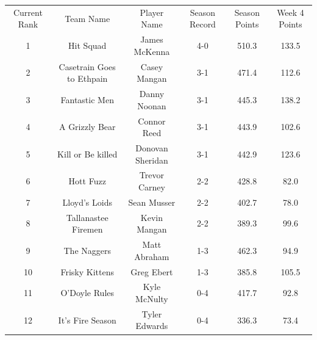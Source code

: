 \documentclass[11pt,letterpaper]{article}
\begin{document}
\newpage
{}
\vspace{-25pt}
\begin{table} [h]
\footnotesize
\begin{center}
\begin{tabular} { c c c c c c }
\\[3mm] Current Rank & Team Name & Player Name & Season Record &  Season Points & Week 4 Points
\\[3mm] 1 & Hit Squad & James McKenna & 4-0 & 510.3 & 133.5
\\ 2 & Casetrain Goes to Ethpain & Casey Mangan & 3-1 & 471.4 & 112.6
\\ 3 & Fantastic Men & Danny Noonan & 3-1 & 445.3 & 138.2
\\ 4 &  A Grizzly Bear & Connor Reed & 3-1 & 443.9 & 102.6
\\ 5 & Kill or Be killed & Donovan Sheridan & 3-1 & 442.9 & 123.6
\\ 6 & Hott Fuzz & Trevor Carney & 2-2 & 428.8 & 82.0
\\ 7 & Lloyd's Loids & Sean Musser & 2-2 & 402.7 & 78.0
\\ 8 & Tallanastee Firemen & Kevin Mangan & 2-2 & 389.3 & 99.6
\\ 9 & The Naggers & Matt Abraham & 1-3 & 462.3 & 94.9
\\ 10 & Frisky Kittens & Greg Ebert & 1-3 & 385.8 & 105.5
\\ 11 & O'Doyle Rules & Kyle McNulty & 0-4 & 417.7 & 92.8
\\ 12 & It's Fire Season & Tyler Edwards & 0-4 & 336.3 & 73.4
\end{tabular}
\end{center}
\end{table}

\newpage
{}
\end{document}
